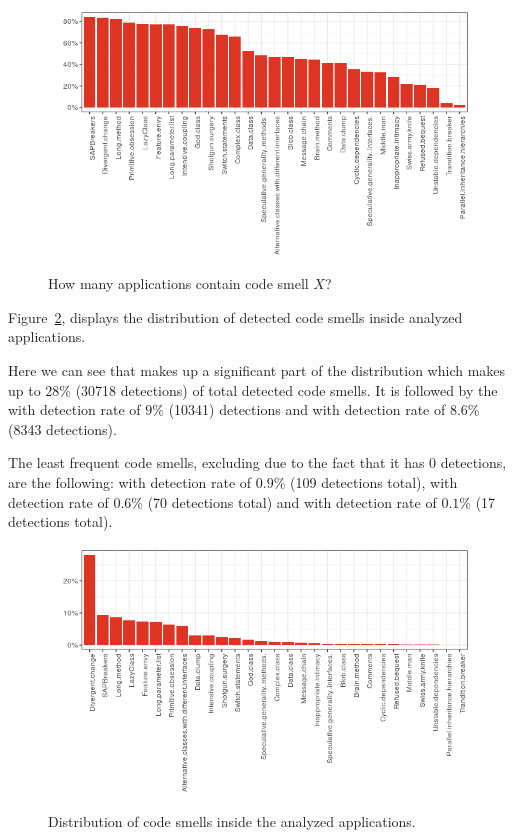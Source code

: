\begin{figure}
    \includegraphics[scale=0.8]{figures/applications_contains_x_3.png}
    \caption{How many applications contain code smell $X$?}
    \label{fig:applicaitons_contain_x}
\end{figure}

Figure~\ref{fig:distribution}, displays the distribution of detected code smells inside analyzed applications.

Here we can see that  makes up a significant part of the distribution which makes up to
$28\%$ (30718 detections) of total detected code smells.
It is followed by the  with detection rate of $9\%$ (10341) detections and 
with detection rate of $8.6\%$ (8343 detections).

The least frequent code smells, excluding  due to the fact that it has 0 detections,
are the following:  with detection rate of $0.9\%$ (109 detections total),
 with detection rate of $0.6\%$ (70 detections total) and
 with detection rate of $0.1\%$ (17 detections total).

\begin{figure}
    \includegraphics[scale=0.8]{figures/distribution_3.png}
    \caption{Distribution of code smells inside the analyzed applications.}
    \label{fig:distribution}
\end{figure}

\FloatBarrier

